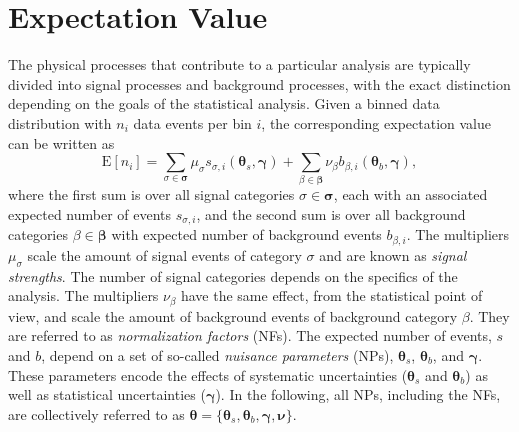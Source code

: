 \section{Expectation Value}
\label{sec:exp-value}
The physical processes that contribute to a particular analysis are typically divided into signal processes and background processes, with the exact distinction depending on the goals of the statistical analysis.
Given a binned data distribution with $n_i$ data events per bin $i$, the corresponding expectation value can be written as
\begin{equation}
    \text{E}[n_i] = \sum_{\sigma \in \pmb{\sigma}} \mu_\sigma s_{\sigma,i}(\pmb{\theta}_s, \pmb{\gamma}) + \sum_{\beta \in \pmb{\beta}} \nu_\beta b_{\beta,i}(\pmb{\theta}_b, \pmb{\gamma}),
\end{equation}
where the first sum is over all signal categories $\sigma \in \pmb{\sigma}$, each with an associated expected number of events $s_{\sigma, i}$, and the second sum is over all background categories $\beta \in \pmb{\beta}$ with expected number of background events $b_{\beta,i}$. 
The multipliers $\mu_\sigma$ scale the amount of signal events of category $\sigma$ and are known as \emph{signal strengths}. 
The number of signal categories depends on the specifics of the analysis. The multipliers $\nu_\beta$ have the same effect, from the statistical point of view, and scale the amount of background events of background category $\beta$. They are referred to as \emph{normalization factors} (NFs). 
The expected number of events, $s$ and $b$, depend on a set of so-called \emph{nuisance parameters} (NPs), $\pmb{\theta}_s$, $\pmb{\theta}_b$, and $\pmb{\gamma}$. These parameters encode the effects of systematic uncertainties ($\pmb{\theta}_s$ and $\pmb{\theta}_b$) as well as statistical uncertainties ($\pmb{\gamma}$). In the following, all NPs, including the NFs, are collectively referred to as $\pmb{\theta} = \{\pmb{\theta}_s, \pmb{\theta}_b, \pmb{\gamma}, \pmb{\nu}\}$. 

